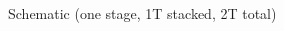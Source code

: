 \begin{center}
    Schematic (one stage, 1T stacked, 2T total)
    \begin{figure}[h] %
        \begin{center}
            \begin{circuitdiagram}{10}{15}
            \end{circuitdiagram}
        \end{center}
    \end{figure}
\end{center}
